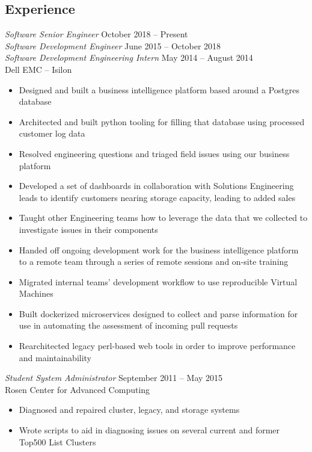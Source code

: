 \documentclass[line,margin]{res}
\begin{document}
\begin{resume}
  \section{\textcolor{TealBlue}{Experience}} 
    {\sl Software Senior Engineer\/} \hfill October 2018 -- Present \\%
    {\sl Software Development Engineer\/} \hfill June 2015 -- October 2018 \\%
    {\sl Software Development Engineering Intern\/} \hfill May 2014 -- August 2014 \\%
      Dell EMC -- Isilon %
      \begin{itemize} 
	\setlength{\itemsep}{-2pt}
        \item Designed and built a business intelligence platform based around a Postgres database
        \item Architected and built python tooling for filling that database using processed customer log data
        \item Resolved engineering questions and triaged field issues using our business platform
        \item Developed a set of dashboards in collaboration with Solutions Engineering leads to identify customers nearing storage capacity, leading to added sales
        \item Taught other Engineering teams how to leverage the data that we collected to investigate issues in their components
        \item Handed off ongoing development work for the business intelligence platform to a remote team through a series of remote sessions and on-site training
        \item Migrated internal teams' development workflow to use reproducible Virtual Machines
	\item Built dockerized microservices designed to collect and parse information for use in automating the assessment of incoming pull requests
	\item Rearchitected legacy perl-based web tools in order to improve performance and maintainability
      \end{itemize}

    {\sl Student System Administrator\/} \hfill September 2011 -- May 2015 \\%
      Rosen Center for Advanced Computing
      \begin{itemize}
	\setlength{\itemsep}{-2pt}
        \item Diagnosed and repaired cluster, legacy, and storage systems
        \item Wrote scripts to aid in diagnosing issues on several current and former Top500 List Clusters
      \end{itemize}


\end{resume}
\end{document}
